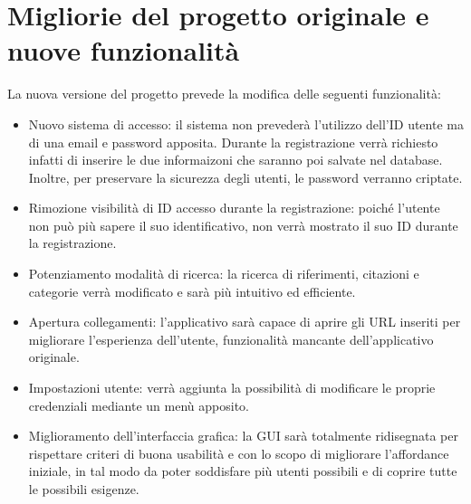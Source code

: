 \raggedright{\section{Migliorie del progetto originale e nuove funzionalità}}
La nuova versione del progetto prevede la modifica delle seguenti funzionalità:
\begin{itemize}
    \item \label{nuovo:accesso} Nuovo sistema di accesso: il sistema non prevederà l'utilizzo dell'ID utente ma di una email e password apposita. Durante la registrazione verrà richiesto infatti di inserire le due informaizoni che saranno poi salvate nel database. Inoltre, per preservare la sicurezza degli utenti, le password verranno criptate.
    \item Rimozione visibilità di ID accesso durante la registrazione: poiché l'utente non può più sapere il suo identificativo, non verrà mostrato il suo ID durante la registrazione.
    \item Potenziamento modalità di ricerca: la ricerca di riferimenti, citazioni e categorie verrà modificato e sarà più intuitivo ed efficiente.
    \item Apertura collegamenti: l'applicativo sarà capace di aprire gli URL inseriti per migliorare l'esperienza dell'utente, funzionalità mancante dell'applicativo originale.
    \item Impostazioni utente: verrà aggiunta la possibilità di modificare le proprie credenziali mediante un menù apposito.
    \item Miglioramento dell'interfaccia grafica: la GUI sarà totalmente ridisegnata per rispettare criteri di buona usabilità e con lo scopo di migliorare l'affordance iniziale, in tal modo da poter soddisfare più utenti possibili e di coprire tutte le possibili esigenze.
\end{itemize}
